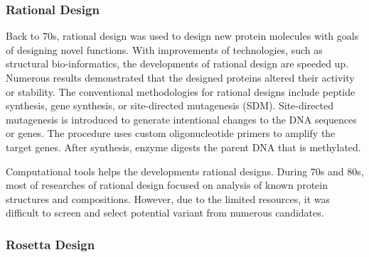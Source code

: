 \begin{refsection}
\subsubsection{Rational Design}

Back to 70s, rational design was used to design new protein molecules with
goals of designing novel functions\cite{Seydel1980}. With improvements of
technologies, such as structural bio-informatics, the developments of rational
design are speeded up.  Numerous results demonstrated that the designed
proteins altered their activity or stability\cite{Otten2010,Moss2009}. The
conventional methodologies for rational designs include peptide synthesis, gene
synthesis, or site-directed mutagenesis (SDM). Site-directed mutagenesis is
introduced to generate intentional changes to the DNA sequences or genes. The
procedure uses custom oligonucleotide primers to amplify the target genes.
After synthesis, enzyme digests the parent DNA that is methylated.   

Computational tools helps the developments rational designs. During 70s and
80s, most of researches of rational design focused on analysis of known protein
structures and compositions. However, due to the limited resources, it was
difficult to screen and select potential variant from numerous candidates.

\subsubsection{Rosetta Design}


\end{refsection}
